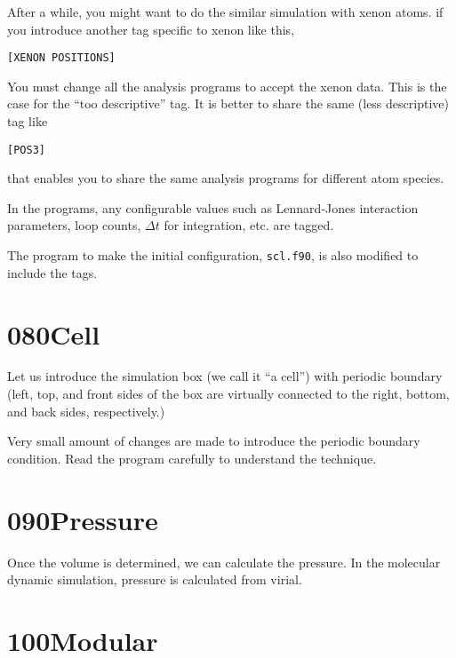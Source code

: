 \documentclass[a4,10pt]{article}
\begin{document}
After a while, you might want to do the similar simulation with xenon atoms.  if you introduce another tag specific to xenon like this,
\begin{screen}\begin{verbatim}
[XENON POSITIONS]
\end{verbatim}\end{screen}
You must change all the analysis programs to accept the xenon data.  This is the case for the ``too descriptive'' tag.  It is better to share the same (less descriptive) tag like
\begin{screen}\begin{verbatim}
[POS3]
\end{verbatim}\end{screen}
that enables you to share the same analysis programs for different atom species.

In the programs, any configurable values such as Lennard-Jones interaction parameters, loop counts, $\Delta t$ for integration, etc. are tagged.

The program to make the initial configuration, {\tt scl.f90}, is also modified to include the tags.

\section{080Cell}

Let us introduce the simulation box (we call it ``a cell'') with periodic boundary (left, top, and front sides of the box are virtually connected to the right, bottom, and back sides, respectively.)

Very small amount of changes are made to introduce the periodic boundary condition.  Read the program carefully to understand the technique.


\section{090Pressure}

Once the volume is determined, we can calculate the pressure.  In the molecular dynamic simulation, pressure is calculated from virial.


\section{100Modular}
\end{document}
